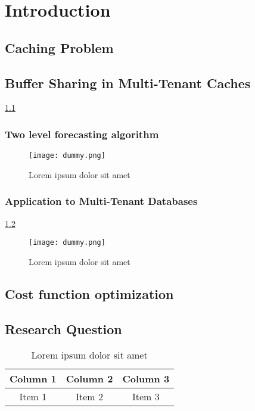 \chapter{Introduction}

\section{Caching Problem}

\lipsum[1-3]

\section{Buffer Sharing in Multi-Tenant Caches}

\lipsum[1-1] \ref{fig:figA-1}

\subsection{Two level forecasting algorithm}

\begin{figure}[H]
    \centering
    \texttt{[image: dummy.png]}
    \caption{Lorem ipsum dolor sit amet}
    \label{fig:figA-1}
\end{figure}


\subsection{Application to Multi-Tenant Databases}

\lipsum[1-1] \ref{fig:figB-1}

\begin{figure}[H]
    \centering
    \texttt{[image: dummy.png]}
    \caption{Lorem ipsum dolor sit amet}
    \label{fig:figB-1}
\end{figure}

\lipsum[1-1] \cite{reference-1}

\section{Cost function optimization}

\lipsum[1-1] \cite{reference-3}

\section{Research Question}

\begin{table}[ht!]
    \centering
    \begin{tabular}{c c c}
        \hline
        Column 1 & Column 2 & Column 3 \\
        \hline
        Item 1   & Item 2   & Item 3   \\
    \end{tabular}
    \caption{Lorem ipsum dolor sit amet}
    \label{tab:tabA-1}
\end{table}

